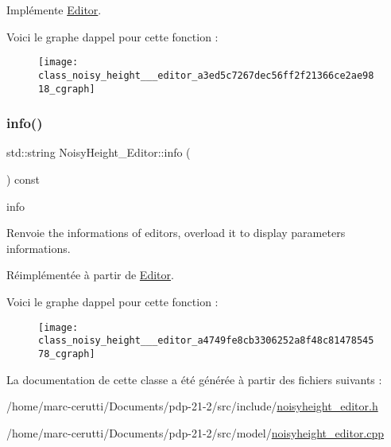 Implémente \hyperlink{class_editor_abca97ba11536c494a0c26bac77917792}{Editor}.

Voici le graphe d\textquotesingle{}appel pour cette fonction \+:\nopagebreak
\begin{figure}[H]
\begin{center}
\leavevmode
\texttt{[image: class\_noisy\_height\_\_\_editor\_a3ed5c7267dec56ff2f21366ce2ae9818\_cgraph]}
\end{center}
\end{figure}
\mbox{\label{class_noisy_height___editor_a4749fe8cb3306252a8f48c8147854578}} 
\subsubsection{\texorpdfstring{info()}{info()}}
{\footnotesize\ttfamily std\+::string Noisy\+Height\+\_\+\+Editor\+::info (\begin{DoxyParamCaption}{ }\end{DoxyParamCaption}) const\hspace{0.3cm}{\ttfamily [virtual]}}



info 

\begin{DoxyReturn}{Renvoie}
the informations of editors, overload it to display parameters informations. 
\end{DoxyReturn}


Réimplémentée à partir de \hyperlink{class_editor_a5747cd74b71d67f6d39b094071058382}{Editor}.

Voici le graphe d\textquotesingle{}appel pour cette fonction \+:\nopagebreak
\begin{figure}[H]
\begin{center}
\leavevmode
\texttt{[image: class\_noisy\_height\_\_\_editor\_a4749fe8cb3306252a8f48c8147854578\_cgraph]}
\end{center}
\end{figure}


La documentation de cette classe a été générée à partir des fichiers suivants \+:\begin{DoxyCompactItemize}
\item 
/home/marc-\/cerutti/\+Documents/pdp-\/21-\/2/src/include/\hyperlink{noisyheight__editor_8h}{noisyheight\+\_\+editor.\+h}\item 
/home/marc-\/cerutti/\+Documents/pdp-\/21-\/2/src/model/\hyperlink{noisyheight__editor_8cpp}{noisyheight\+\_\+editor.\+cpp}\end{DoxyCompactItemize}
